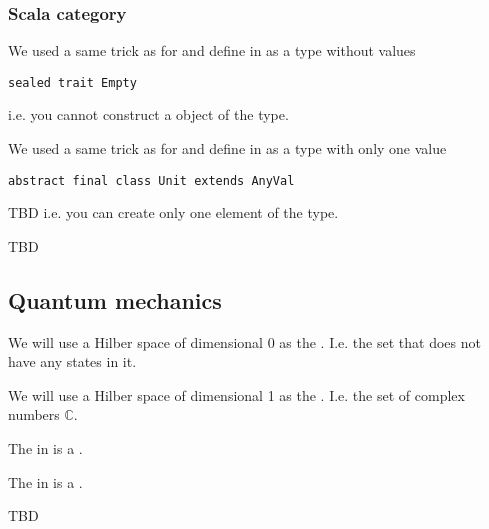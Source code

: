 \subsubsection{\textbf{Scala} category}
\begin{example}
\label{ex:scala_initial_object}
We used a same trick as for  and define
 in  as a
type without values 
\begin{verbatim}
sealed trait Empty
\end{verbatim}
i.e. you cannot construct a object of the type.
\end{example}

\begin{example}
\label{ex:scala_terminal_object}
We used a same trick as for  and define
 in  as a
type with only one value
\begin{verbatim}
abstract final class Unit extends AnyVal
\end{verbatim}
TBD
i.e. you can create only one element of the type.
\end{example}

TBD

\subsection{Quantum mechanics}
\begin{example}
\label{ex:quant_initial_object}
We will use a Hilber space of dimensional 0 as the
. I.e. the set that does not have any
states in it.
\end{example}

\begin{example}
  \label{ex:quant_terminal_object}
We will use a Hilber space of dimensional 1 as the
. I.e. the set of complex numbers
$\mathbb{C}$.   
\end{example}

\begin{example}
  \label{ex:quant_product}
  The  in  is a
  .
\end{example}

\begin{example}
  \label{ex:quant_sum}
  The  in  is a
  .
\end{example}

TBD


